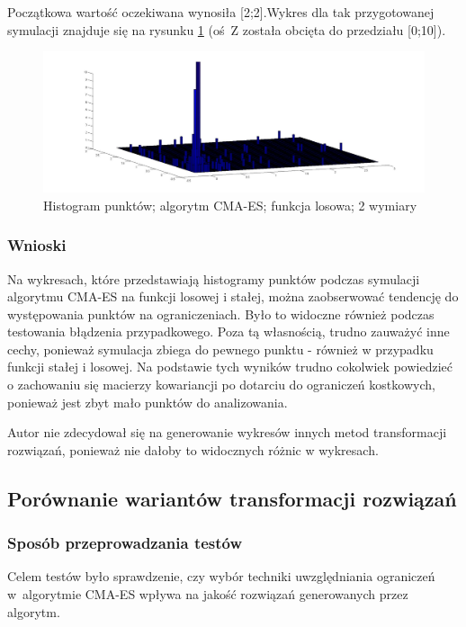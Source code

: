 \documentclass{mini}
\begin{document}
Początkowa wartość oczekiwana wynosiła [2;2].Wykres dla tak przygotowanej symulacji znajduje się na rysunku \ref{cmaes:x2} (oś~Z została obcięta do przedziału [0;10]).

\begin{figure}[H]
\centering
\includegraphics[width=\textwidth]{cmaes-x2dim2-boundaries-v2}
\caption{Histogram punktów; algorytm CMA-ES; funkcja losowa; 2 wymiary}
\label{cmaes:x2}
\end{figure}

\subsubsection{Wnioski}
\hspace{3,4ex}Na wykresach, które przedstawiają histogramy punktów podczas symulacji algorytmu CMA-ES na funkcji losowej i stałej, można zaobserwować tendencję do występowania punktów na ograniczeniach. Było to widoczne również podczas testowania błądzenia przypadkowego. Poza tą własnością, trudno zauważyć inne cechy, ponieważ symulacja zbiega do pewnego punktu - również w przypadku funkcji stałej i losowej. Na podstawie tych wyników trudno cokolwiek powiedzieć o zachowaniu się macierzy kowariancji po dotarciu do ograniczeń kostkowych, ponieważ jest zbyt mało punktów do analizowania.

Autor nie zdecydował się na generowanie wykresów innych metod transformacji rozwiązań, ponieważ nie dałoby to widocznych różnic w wykresach.

\subsection{Porównanie wariantów transformacji rozwiązań}

\subsubsection{Sposób przeprowadzania testów}
\hspace{3,4ex}Celem testów było sprawdzenie, czy wybór techniki uwzględniania ograniczeń w~algorytmie CMA-ES wpływa na jakość rozwiązań generowanych przez algorytm.
\end{document}
